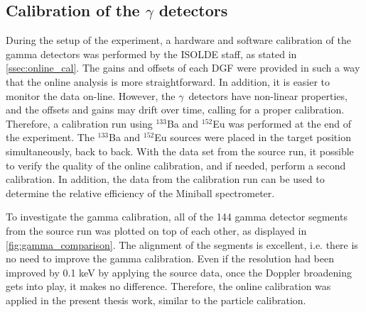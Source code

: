 \documentclass[twoside,english]{uiofysmaster/uiofysmaster}
\newcommand{\Sm}{$^{140}$Sm} %
\newcommand{\Pb}{$^{208}$Pb}
\newcommand{\ga}{$\gamma$}
\let\orgautoref\autoref
\renewcommand{\autoref}
        {%
		 \def\sectionautorefname{Section}%
		 \def\subsectionautorefname{Section}%
		 \def\subsubsectionautorefname{Section}%
		 \def\chapterautorefname{Chapter}%
          \orgautoref}
\begin{document}



\subsection{Calibration of the \texorpdfstring{$\gamma$}{gamma} detectors}\label{ssec:gamma}
During the setup of the experiment, a hardware and software calibration of the gamma detectors was performed by the ISOLDE staff, as stated in \autoref{ssec:online_cal}. 
The gains and offsets of each DGF were provided in such a way that the online analysis is more straightforward. 
In addition, it is easier to monitor the data on-line. 
However, the \ga\ detectors have non-linear properties, and the offsets and gains may drift over time, calling for a proper calibration. 
Therefore, a calibration run using $^{133}$Ba and $^{152}$Eu was performed at the end of the experiment. 
The $^{133}$Ba and $^{152}$Eu sources were placed in the target position simultaneously, back to back. 
With the data set from the source run, it possible to verify the quality of the online calibration, and if needed, perform a second calibration. 
In addition, the data from the calibration run can be used to determine the relative efficiency of the Miniball spectrometer.

To investigate the gamma calibration, all of the 144 gamma detector segments from the source run was plotted on top of each other, as displayed in \autoref{fig:gamma_comparison}. 
The alignment of the segments is excellent, i.e. there is no need to improve the gamma calibration. 
Even if the resolution had been improved by 0.1 keV by applying the source data, once the Doppler broadening gets into play, it makes no difference. 
Therefore, the online calibration was applied in the present thesis work, similar to the particle calibration.
\end{document}
